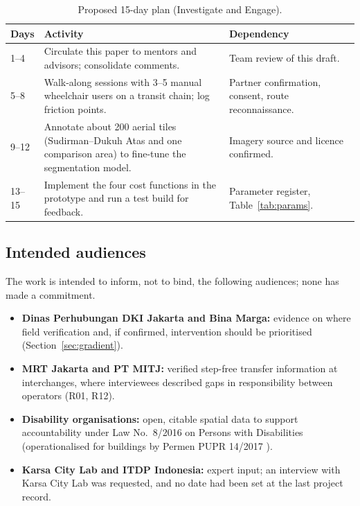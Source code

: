 \documentclass[11pt,a4paper]{article}
\begin{document}
\begin{table}[H]
\centering
\small
\caption{Proposed 15-day plan (Investigate and Engage).}
\label{tab:roadmap}
\renewcommand{\arraystretch}{1.15}
\begin{tabularx}{\textwidth}{@{}P{1.6cm} Y Y@{}}
\toprule
\textbf{Days} & \textbf{Activity} & \textbf{Dependency} \\
--4 & Circulate this paper to mentors and advisors; consolidate comments. & Team review of this draft. \\
5--8 & Walk-along sessions with 3--5 manual wheelchair users on a transit chain; log friction points. & Partner confirmation, consent, route reconnaissance. \\
9--12 & Annotate about 200 aerial tiles (Sudirman--Dukuh Atas and one comparison area) to fine-tune the segmentation model. & Imagery source and licence confirmed. \\
13--15 & Implement the four cost functions in the prototype and run a test build for feedback. & Parameter register, Table~\ref{tab:params}. \\
\bottomrule
\end{tabularx}
\end{table}

\subsection{Intended audiences}

The work is intended to inform, not to bind, the following audiences; none has made a commitment.
\begin{itemize}
  \item \textbf{Dinas Perhubungan DKI Jakarta and Bina Marga:} evidence on where field verification and,
    if confirmed, intervention should be prioritised (Section~\ref{sec:gradient}).
  \item \textbf{MRT Jakarta and PT MITJ:} verified step-free transfer information at interchanges, where
    interviewees described gaps in responsibility between operators (R01, R12).
  \item \textbf{Disability organisations:} open, citable spatial data to support accountability under
    Law No.~8/2016 on Persons with Disabilities (operationalised for buildings by Permen PUPR 14/2017 \cite{permenpupr14_2017}).
  \item \textbf{Karsa City Lab and ITDP Indonesia:} expert input; an interview with Karsa City Lab was
    requested, and no date had been set at the last project record.
\end{itemize}
\end{document}
